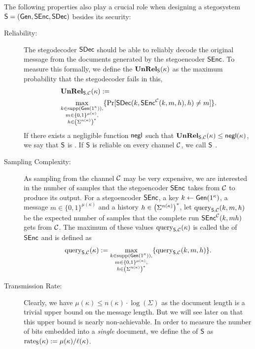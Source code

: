 The following properties also play a crucial role when designing a
stegosystem $\operatorname{\mathsf{S}}=(\operatorname{\mathsf{Gen}},\operatorname{\mathsf{SEnc}},\operatorname{\mathsf{SDec}})$ besides its security:
\begin{description}
\item[Reliability:] The stegodecoder $\operatorname{\mathsf{SDec}}$ should be able to reliably decode the
  original message from the documents generated by the stegoencoder
  $\operatorname{\mathsf{SEnc}}$. To measure this formally, we define the 
  $\operatorname{\mathbf{UnRel}}_{\operatorname{\mathsf{S}}}(\kappa)$ as the maximum probability that the
  stegodecoder fails in this, \ie
  \begin{align*}
    &\operatorname{\mathbf{UnRel}}_{\operatorname{\mathsf{S}},\mathcal{C}}(\kappa) := \\
    &\max_{\substack{k\in \operatorname{supp}(\operatorname{\mathsf{Gen}}(1^{\kappa})),\\ m \in
    \{0,1\}^{\mu(\kappa)},\\ h\in
    \left(\Sigma^{n(\kappa)}\right)^{*}}}\{\Pr[\operatorname{\mathsf{SDec}}(k,\operatorname{\mathsf{SEnc}}^{\mathcal{C}}(k,m,h),h)\neq m]\}. 
  \end{align*}
  If there exists a negligible function $\operatorname{\mathsf{negl}}$ such that
  $\operatorname{\mathbf{UnRel}}_{\operatorname{\mathsf{S}},\mathcal{C}}(\kappa)\leq \operatorname{\mathsf{negl}}(\kappa)$, we say that $\operatorname{\mathsf{S}}$
  is . If $\operatorname{\mathsf{S}}$ is reliable on every
  channel $\mathcal{C}$, we call $\operatorname{\mathsf{S}}$ . 
\item[Sampling Complexity:] As sampling from the channel $\mathcal{C}$ may be
  very expensive, we are interested in the number of samples that the
  stegoencoder $\operatorname{\mathsf{SEnc}}$ takes from $\mathcal{C}$ to produce its output. For a
  stegoencoder $\operatorname{\mathsf{SEnc}}$, a key $k\gets \operatorname{\mathsf{Gen}}(1^{\kappa})$, a message
  $m\in \{0,1\}^{\mu(\kappa)}$ and a history $h\in \left(\Sigma^{n(\kappa)}\right)^{*}$, let
  $\operatorname{query}_{\operatorname{\mathsf{S}},\mathcal{C}}(k,m,h)$ be the expected number of samples that the
  complete run $\operatorname{\mathsf{SEnc}}^{\mathcal{C}}(k,mh)$ gets from $\mathcal{C}$. The maximum of
  these values $\operatorname{query}_{\operatorname{\mathsf{S}},\mathcal{C}}(\kappa)$ is called the  of $\operatorname{\mathsf{SEnc}}$ and is defined as
  \begin{align*}
    \operatorname{query}_{\operatorname{\mathsf{S}},\mathcal{C}}(\kappa) := \max_{\substack{k\in \operatorname{supp}(\operatorname{\mathsf{Gen}}(1^{\kappa})),\\ m \in
    \{0,1\}^{\mu(\kappa)},\\ h\in \left(\Sigma^{n(\kappa)}\right)^{*}}}\{\operatorname{query}_{\operatorname{\mathsf{S}},\mathcal{C}}(k,m,h)\}.
  \end{align*}
\item[Transmission Rate:] Clearly, we have
  $\mu(\kappa) \leq n(\kappa)\cdot \log(\Sigma)$ as the document length
  is a trivial upper bound on the message length. But we will see later
  on that this upper bound is nearly non-achievable. In order to measure
  the number of bits embedded into a \emph{single} document, we define the
   of $\operatorname{\mathsf{S}}$ as 
  $\operatorname{rate}_{\operatorname{\mathsf{S}}}(\kappa) := \mu(\kappa)/\ell(\kappa)$. 


\end{description}
